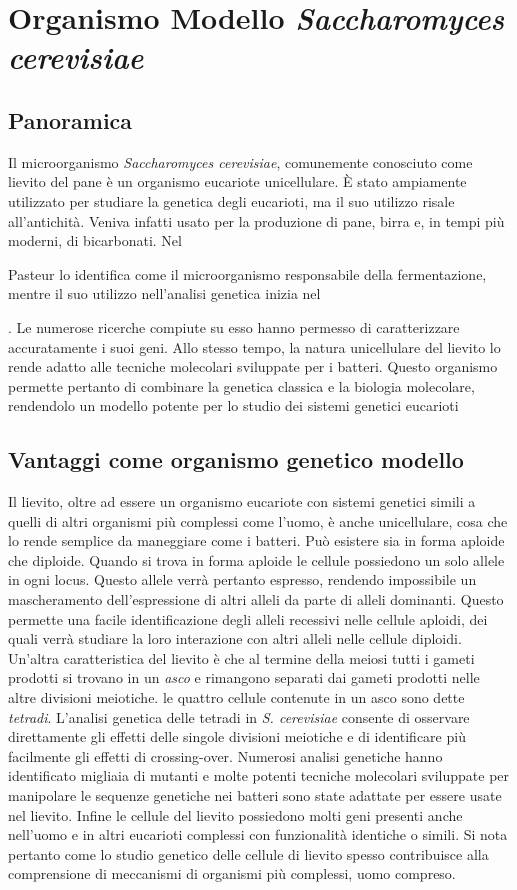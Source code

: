 \section*{Organismo Modello \emph{Saccharomyces cerevisiae}}

	\subsection*{Panoramica}
	Il microorganismo \emph{Saccharomyces cerevisiae}, comunemente conosciuto come lievito del pane \`e un organismo eucariote unicellulare.
	\`E stato ampiamente utilizzato per studiare la genetica degli eucarioti, ma il suo utilizzo risale all'antichit\`a.
	Veniva infatti usato per la produzione di pane, birra e, in tempi pi\`u moderni, di bicarbonati.
	Nel \date{1857} Pasteur lo identifica come il microorganismo responsabile della fermentazione, mentre il suo utilizzo nell'analisi genetica inizia nel \date{1935}.
	Le numerose ricerche compiute su esso hanno permesso di caratterizzare accuratamente i suoi geni.
	Allo stesso tempo, la natura unicellulare del lievito lo rende adatto alle tecniche molecolari sviluppate per i batteri.
	Questo organismo permette pertanto di combinare la genetica classica e la biologia molecolare, rendendolo un modello potente per lo studio dei sistemi genetici eucarioti

	\subsection*{Vantaggi come organismo genetico modello}
	Il lievito, oltre ad essere un organismo eucariote con sistemi genetici simili a quelli di altri organismi pi\`u complessi come l'uomo, \`e anche unicellulare, cosa che lo rende semplice da maneggiare come i batteri.
	Pu\`o esistere sia in forma aploide che diploide.
	Quando si trova in forma aploide le cellule possiedono un solo allele in ogni locus.
	Questo allele verr\`a pertanto espresso, rendendo impossibile un mascheramento dell'espressione di altri alleli da parte di alleli dominanti.
	Questo permette una facile identificazione degli alleli recessivi nelle cellule aploidi, dei quali verr\`a studiare la loro interazione con altri alleli nelle cellule diploidi.
	Un'altra caratteristica del lievito \`e che al termine della meiosi tutti i gameti prodotti si trovano in un \emph{asco} e rimangono separati dai gameti prodotti nelle altre divisioni meiotiche.
	le quattro cellule contenute in un asco sono dette \emph{tetradi}.
	L'analisi genetica delle tetradi in \emph{S. cerevisiae} consente di osservare direttamente gli effetti delle singole divisioni meiotiche e di identificare pi\`u facilmente gli effetti di crossing-over.
	Numerosi analisi genetiche hanno identificato migliaia di mutanti e molte potenti tecniche molecolari sviluppate per manipolare le sequenze genetiche nei batteri sono state adattate per essere usate nel lievito.
	Infine le cellule del lievito possiedono molti geni presenti anche nell'uomo e in altri eucarioti complessi con funzionalit\`a identiche o simili.
	Si nota pertanto come lo studio genetico delle cellule di lievito spesso contribuisce alla comprensione di meccanismi di organismi pi\`u complessi, uomo compreso.


